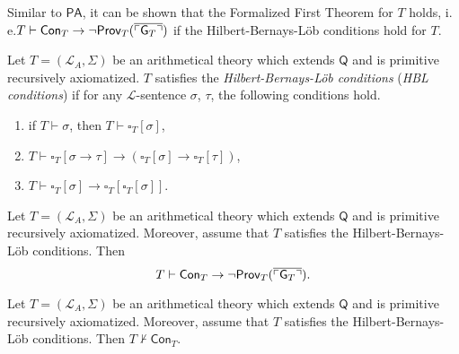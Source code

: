 Similar to $\mathsf{PA}$, it can be shown that the Formalized First Theorem for $T$ holds, i.\,e.\@ $T \vdash \mathsf{Con}_T \rightarrow \lnot \mathsf{Prov}_T (\overline{\ulcorner \mathsf{G}_T \urcorner})$ if the Hilbert-Bernays-Löb conditions hold for $T$.

\begin{dfn}\label{dfn:HBL}
Let $T = (\mathcal{L}_A, \Sigma)$ be an arithmetical theory which extends $\mathsf{Q}$ and is primitive recursively axiomatized. $T$ satisfies the \textit{Hilbert-Bernays-L\"ob conditions} (\textit{HBL conditions}) if for any $\mathcal{L}$-sentence $\sigma$, $\tau$, the following conditions hold.
\begin{enumerate}
\item if $T \vdash \sigma$, then $T \vdash \square_T [\sigma]$,
\item $T \vdash  \square_T [ \sigma \rightarrow \tau] \rightarrow ( \square_T [\sigma] \rightarrow \square_T [ \tau])$,
\item $T \vdash \square_T [\sigma ]\rightarrow \square_T [\square_T [\sigma]]$.
\end{enumerate}
\end{dfn}

\begin{thm}
Let $T = (\mathcal{L}_A, \Sigma)$ be an arithmetical theory which extends $\mathsf{Q}$ and is primitive recursively axiomatized. Moreover, assume that $T$ satisfies the Hilbert-Bernays-L\"ob conditions. Then
\[T \vdash \mathsf{Con}_T \rightarrow \lnot \mathsf{Prov}_T (\overline{\ulcorner \mathsf{G}_T \urcorner}).\]
\end{thm}

\begin{thm}
Let $T = (\mathcal{L}_A, \Sigma)$ be an arithmetical theory which extends $\mathsf{Q}$ and is primitive recursively axiomatized. Moreover, assume that $T$ satisfies the Hilbert-Bernays-L\"ob conditions. Then $T \nvdash \mathsf{Con}_T$.
\end{thm}